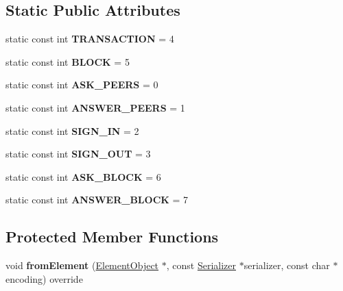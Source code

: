 \subsection*{Static Public Attributes}
\begin{DoxyCompactItemize}
\item 
\mbox{\label{classMessage_a18a7a0d3879210c798f3d84c820f03c1}} 
static const int {\bfseries T\+R\+A\+N\+S\+A\+C\+T\+I\+ON} = 4
\item 
\mbox{\label{classMessage_a3d3ef3111518cd65c0b7f5ec6660888a}} 
static const int {\bfseries B\+L\+O\+CK} = 5
\item 
\mbox{\label{classMessage_a9810d3cefb1b33e709cb393583a7a877}} 
static const int {\bfseries A\+S\+K\+\_\+\+P\+E\+E\+RS} = 0
\item 
\mbox{\label{classMessage_aa33f42e5795c4df01c7437961d512eaa}} 
static const int {\bfseries A\+N\+S\+W\+E\+R\+\_\+\+P\+E\+E\+RS} = 1
\item 
\mbox{\label{classMessage_a64b7688dfdd50a6254bf45b51d2118d4}} 
static const int {\bfseries S\+I\+G\+N\+\_\+\+IN} = 2
\item 
\mbox{\label{classMessage_aba70c352293fee66004d729ccef3ee48}} 
static const int {\bfseries S\+I\+G\+N\+\_\+\+O\+UT} = 3
\item 
\mbox{\label{classMessage_a62ac5b91838e79a11079869015261e14}} 
static const int {\bfseries A\+S\+K\+\_\+\+B\+L\+O\+CK} = 6
\item 
\mbox{\label{classMessage_a1580f4a26d125f71e2af1ef6001ac656}} 
static const int {\bfseries A\+N\+S\+W\+E\+R\+\_\+\+B\+L\+O\+CK} = 7
\end{DoxyCompactItemize}
\subsection*{Protected Member Functions}
\begin{DoxyCompactItemize}
\item 
\mbox{\label{classSignMessage_a35855647925ec76036ed4602743ed118}} 
void {\bfseries from\+Element} (\mbox{\hyperlink{classElementObject}{Element\+Object}} $\ast$, const \mbox{\hyperlink{classSerializer}{Serializer}} $\ast$serializer, const char $\ast$encoding) override
\end{DoxyCompactItemize}
